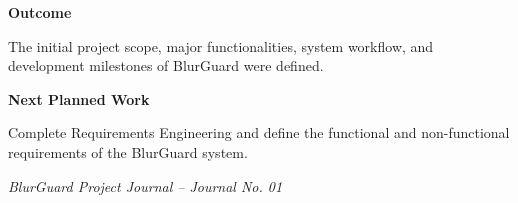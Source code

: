 \documentclass[12pt,a4paper]{article}
\begin{document}
\vspace{8pt}


\textbf{\large Outcome}

\vspace{4pt}

The initial project scope, major functionalities, system workflow, and
development milestones of BlurGuard were defined.

\vspace{8pt}


\textbf{\large Next Planned Work}

\vspace{4pt}

Complete Requirements Engineering and define the functional and
non-functional requirements of the BlurGuard system.

\vfill


\begin{flushright}
    \textit{BlurGuard Project Journal -- Journal No. 01}
\end{flushright}
\end{document}
